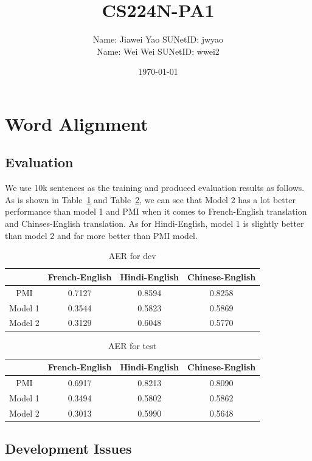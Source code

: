 \documentclass{article}
\title{CS224N-PA1}
\author{Name: Jiawei Yao \quad SUNetID: jwyao \\ Name: Wei Wei \quad SUNetID: wwei2}
\date{\today}
\begin{document}
\maketitle

\section{Word Alignment}

\subsection{Evaluation}

We use 10k sentences as the training and produced evaluation results as follows. As is shown in Table~\ref{tab:dev} and Table~\ref{tab:test}, we can see that Model 2 has a lot better performance than model 1 and PMI when it comes to French-English translation and Chinses-English translation. As for Hindi-English, model 1 is slightly better than model 2 and far more better than PMI model.

\begin{table}[!htb]
\centering
\begin{tabular}{cccc}
 \hline
 & French-English & Hindi-English & Chinese-English \\
 \hline
 PMI & 0.7127 & 0.8594 & 0.8258 \\
 Model 1 & 0.3544 & 0.5823 & 0.5869 \\
 Model 2 & 0.3129 & 0.6048 & 0.5770 \\
 \hline
\end{tabular}
\caption{AER for dev}
\label{tab:dev}
\end{table}

\begin{table}[!htb]
\centering
\begin{tabular}{cccc}
 \hline
 & French-English & Hindi-English & Chinese-English \\
 \hline
 PMI & 0.6917 & 0.8213 & 0.8090 \\
 Model 1 & 0.3494 & 0.5802 & 0.5862 \\
 Model 2 & 0.3013 & 0.5990 & 0.5648 \\
 \hline
\end{tabular}
\caption{AER for test}
\label{tab:test}
\end{table}

\subsection{Development Issues}
\end{document}
